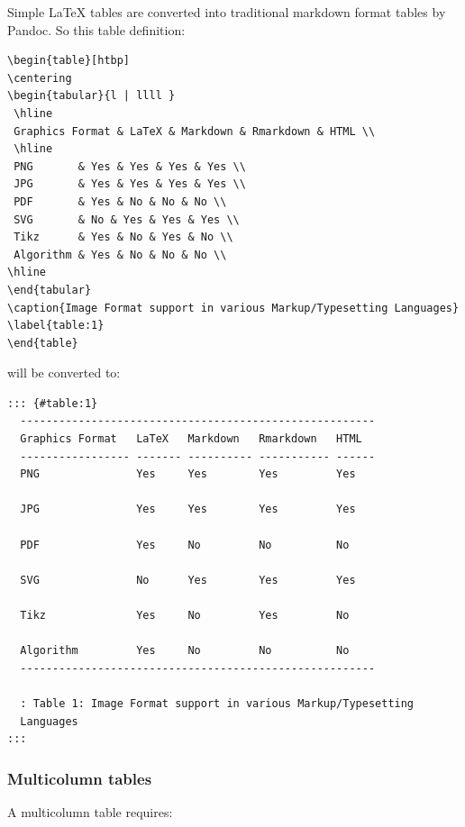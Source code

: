 Simple LaTeX tables are converted into traditional markdown format tables by Pandoc. So this table definition:

\begin{verbatim}
\begin{table}[htbp]
\centering
\begin{tabular}{l | llll }
 \hline
 Graphics Format & LaTeX & Markdown & Rmarkdown & HTML \\
 \hline
 PNG       & Yes & Yes & Yes & Yes \\
 JPG       & Yes & Yes & Yes & Yes \\
 PDF       & Yes & No & No & No \\
 SVG       & No & Yes & Yes & Yes \\
 Tikz      & Yes & No & Yes & No \\
 Algorithm & Yes & No & No & No \\
\hline
\end{tabular}
\caption{Image Format support in various Markup/Typesetting Languages}
\label{table:1}
\end{table}
\end{verbatim}

will be converted to:

\begin{verbatim}
::: {#table:1}
  -------------------------------------------------------
  Graphics Format   LaTeX   Markdown   Rmarkdown   HTML
  ----------------- ------- ---------- ----------- ------
  PNG               Yes     Yes        Yes         Yes

  JPG               Yes     Yes        Yes         Yes

  PDF               Yes     No         No          No

  SVG               No      Yes        Yes         Yes

  Tikz              Yes     No         Yes         No

  Algorithm         Yes     No         No          No
  -------------------------------------------------------

  : Table 1: Image Format support in various Markup/Typesetting
  Languages
:::
\end{verbatim}

\subsubsection{Multicolumn tables}\label{multicolumn-tables}

A multicolumn table requires:

